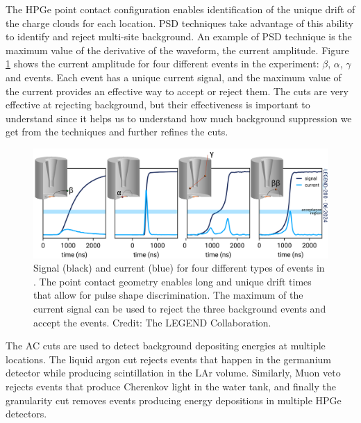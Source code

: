 The HPGe point contact configuration enables identification of the unique drift of the charge clouds for each location. PSD techniques take advantage of this ability to identify and reject multi-site background. An example of PSD technique is the maximum value of the derivative of the waveform, the current amplitude. Figure \ref{ch2_fig_cur_exp} shows the current amplitude for four different events in the experiment: $\beta$, $\alpha$, $\gamma$ and {\tnbb} events. Each event has a unique current signal, and the maximum value of the current provides an effective way to accept or reject them. The cuts are very effective at rejecting background, but their effectiveness is important to understand since it helps us to understand how much background suppression we get from the techniques and further refines the cuts. %


\begin{figure}[!htb]
\centering
  \includegraphics[width=0.99\linewidth]{ch2/figs/psd-showcase.png}
  \caption{Signal (black) and current (blue) for four different types of events in {\Ltwo}. The point contact geometry enables long and unique drift times that allow for pulse shape discrimination. The maximum of the current signal can be used to reject the three background events and accept the {\tnbb} events. Credit: The LEGEND Collaboration.}
\label{ch2_fig_cur_exp}
  \end{figure}
  
The AC cuts are used to detect background depositing energies at multiple locations. The liquid argon cut rejects events that happen in the germanium detector while producing scintillation in the LAr volume. Similarly, Muon veto rejects events that produce Cherenkov light in the water tank, and finally the granularity cut removes events producing energy depositions in multiple HPGe detectors.

